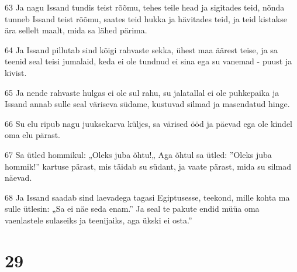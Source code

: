 \par 63 Ja nagu Issand tundis teist rõõmu, tehes teile head ja sigitades teid, nõnda tunneb Issand teist rõõmu, saates teid hukka ja hävitades teid, ja teid kistakse ära sellelt maalt, mida sa lähed pärima.
\par 64 Ja Issand pillutab sind kõigi rahvaste sekka, ühest maa äärest teise, ja sa teenid seal teisi jumalaid, keda ei ole tundnud ei sina ega su vanemad - puust ja kivist.
\par 65 Ja nende rahvaste hulgas ei ole sul rahu, su jalatallal ei ole puhkepaika ja Issand annab sulle seal väriseva südame, kustuvad silmad ja masendatud hinge.
\par 66 Su elu ripub nagu juuksekarva küljes, sa värised ööd ja päevad ega ole kindel oma elu pärast.
\par 67 Sa ütled hommikul: „Oleks juba õhtu!„ Aga õhtul sa ütled: ”Oleks juba hommik!” kartuse pärast, mis täidab su südant, ja vaate pärast, mida su silmad näevad.
\par 68 Ja Issand saadab sind laevadega tagasi Egiptusesse, teekond, mille kohta ma sulle ütlesin: „Sa ei näe seda enam.” Ja seal te pakute endid müüa oma vaenlastele sulaseiks ja teenijaiks, aga ükski ei osta.”

\chapter{29}

